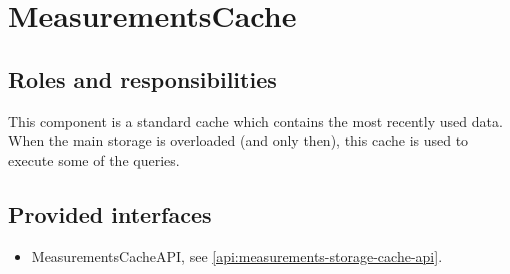 \section{MeasurementsCache}
\label{element:measurements-cache-api}

\subsection{Roles and responsibilities}

\npar This component is a standard cache which contains the most recently used
data. When the main storage is overloaded (and only then), this cache is used to
execute some of the queries. 

\subsection{Provided interfaces}

\begin{itemize}
  \item MeasurementsCacheAPI, see \ref{api:measurements-storage-cache-api}.
\end{itemize}